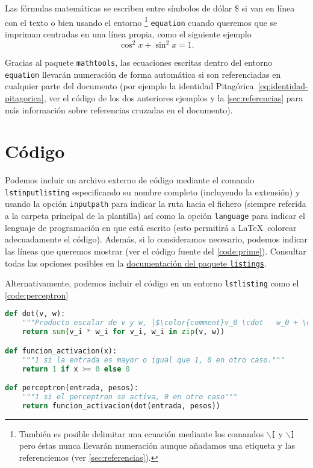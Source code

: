 Las fórmulas matemáticas se escriben entre símbolos de dólar \$ si van en línea con el texto o bien usando el entorno%
\footnote{
  También es posible delimitar una ecuación mediante los comandos \texttt{$\backslash$[} y \texttt{$\backslash$]} pero éstas nunca llevarán numeración aunque añadamos una etiqueta y las referenciemos (ver \autoref{sec:referencias}).
} 
\texttt{equation} cuando queremos que se impriman centradas en una línea propia, como el siguiente ejemplo
\begin{equation}\label{eq:identidad-pitagorica}
  \cos^2 x + \sin^2 x = 1.
\end{equation}


Gracias al paquete \texttt{mathtools}, las ecuaciones escritas dentro del entorno \texttt{equation} llevarán numeración de forma automática si son referenciadas  en cualquier parte del documento (por ejemplo la identidad Pitagórica~\eqref{eq:identidad-pitagorica}, ver el código de los dos anteriores ejemplos y la \autoref{sec:referencias} para más información sobre referencias cruzadas en el documento).

\section{Código}

Podemos incluir un archivo externo de código mediante el comando \texttt{lstinputlisting} especificando su nombre completo (incluyendo la extensión) y usando la opción \texttt{inputpath} para indicar la ruta hacia el fichero (siempre referida a la carpeta principal de la plantilla) así como la opción \texttt{language} para indicar el lenguaje de programación en que está escrito (esto permitirá a \LaTeX\ colorear adecuadamente el código). Además, si lo consideramos necesario, podemos indicar las líneas que queremos mostrar (ver el código fuente del \autoref{code:prime}). Consultar todas las opciones posibles en la \href{https://osl.ugr.es/CTAN/macros/latex/contrib/listings/listings.pdf}{documentación del paquete \texttt{listings}}.



Alternativamente, podemos incluir el código en un entorno \texttt{lstlisting} como el \autoref{code:perceptron}

\begin{lstlisting}[caption={Implementación de un perceptrón}, label={code:perceptron}, language={python}]
def dot(v, w):
    """Producto escalar de v y w, |$\color{comment}v_0 \cdot   w_0 + \cdots + v_n \cdot w_n$|"""
    return sum(v_i * w_i for v_i, w_i in zip(v, w))

def funcion_activacion(x):
    """1 si la entrada es mayor o igual que 1, 0 en otro caso."""
    return 1 if x >= 0 else 0

def perceptron(entrada, pesos):
    """1 si el perceptron se activa, 0 en otro caso"""
    return funcion_activacion(dot(entrada, pesos))
\end{lstlisting}

